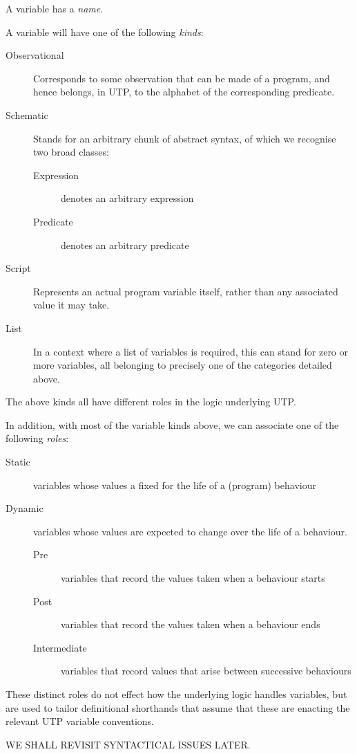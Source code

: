 A variable has a \emph{name}.

A variable will have one of the following \emph{kinds}:
\begin{description}
  \item[Observational]
    Corresponds to some observation that can be made of a program,
    and hence belongs, in UTP,  to the alphabet of the corresponding predicate.
  \item[Schematic]
    Stands for an arbitrary chunk of abstract syntax,
    of which we recognise two broad classes:
    \begin{description}
      \item[Expression] denotes an arbitrary expression
      \item[Predicate] denotes an arbitrary predicate
    \end{description}
  \item[Script]
    Represents an actual program variable itself,
    rather than any associated value it may take.
  \item[List]
   In a context where a list of variables is required,
   this can stand for zero or more variables,
   all belonging to precisely one of the categories detailed above.
\end{description}
The above kinds all have different roles in the logic underlying UTP.

In addition, with most of the variable kinds above,
we can associate one of the following \emph{roles}:
\begin{description}
  \item[Static]
    variables whose values a fixed for the life of a (program) behaviour
  \item[Dynamic]
    variables whose values are expected to change over the life of a behaviour.
    \begin{description}
      \item[Pre]
        variables that record the values taken when a behaviour starts
      \item[Post]
        variables that record the values taken when a behaviour ends
      \item[Intermediate]
        variables that record values that arise between successive behaviours
    \end{description}
\end{description}
These distinct roles do not effect how the underlying logic handles
variables, but are used to tailor definitional shorthands that
assume that these are enacting the relevant UTP variable conventions.

WE SHALL REVISIT SYNTACTICAL ISSUES LATER.
